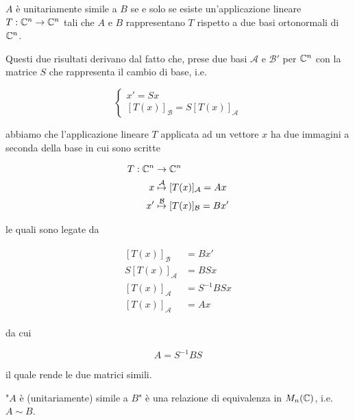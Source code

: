 \begin{definition}
	$ A $ è unitariamente simile a $ B $ se e solo se esiste un'applicazione lineare $ T : \mathbb{C}^{n} \to \mathbb{C}^{n} $ tali che $ A $ e $ B $ rappresentano $ T $ rispetto a due basi ortonormali di $ \mathbb{C}^{n} $.
\end{definition}

Questi due risultati derivano dal fatto che, prese due basi $ \mathcal{A} $ e $ \mathcal{B}' $ per $ \mathbb{C}^{n} $ con la matrice $ S $ che rappresenta il cambio di base, i.e.

\begin{equation}
	\begin{cases}
		x' = S x\\
		[T(x)]_{\mathcal{B}} = S [T(x)]_{\mathcal{A}}
	\end{cases}
\end{equation}

abbiamo che l'applicazione lineare $ T $ applicata ad un vettore $ x $ ha due immagini a seconda della base in cui sono scritte

\begin{align}
	\begin{split}
		T : \mathbb{C}^{n} &\to \mathbb{C}^{n}\\
		x &\stackrel{\mathcal{A}}{\mapsto} [T(x)]_{\mathcal{A}} = A x\\
		x' &\stackrel{\mathcal{B}}{\mapsto} [T(x)]_{\mathcal{B}} = B x'
	\end{split}
\end{align}

le quali sono legate da

\begin{align}
	\begin{split}
		[T(x)]_{\mathcal{B}} &= B x'\\
		S [T(x)]_{\mathcal{A}} &= B S x\\
		[T(x)]_{\mathcal{A}} &= S^{-1} B S x\\
		[T(x)]_{\mathcal{A}} &= A x
	\end{split}
\end{align}

da cui

\begin{equation}
	A = S^{-1} B S
\end{equation}

il quale rende le due matrici simili.

\begin{definition}
	"$ A $ è (unitariamente) simile a $ B $" è una relazione di equivalenza in $ M_{n}(\mathbb{C}) $, i.e. $ A \sim B $.
\end{definition}

